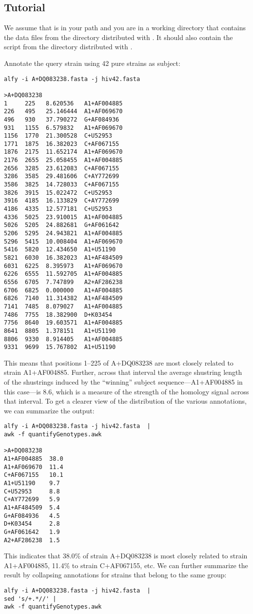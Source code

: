\documentclass[a4paper]{article}
\begin{document}
\begin{itemize}
\section{Tutorial}
We assume that  is in your path and you are in a working
directory that contains the data files from the directory 
distributed with . It should also contain the script
 from the directory  distributed
with .

\bi \I Annotate the query strain  using 42 pure strains
as subject:
\begin{verbatim}
alfy -i A+DQ083238.fasta -j hiv42.fasta

>A+DQ083238
1     225   8.620536   A1+AF004885
226   495   25.146444  A1+AF069670
496   930   37.790272  G+AF084936
931   1155  6.579832   A1+AF069670
1156  1770  21.300528  C+U52953
1771  1875  16.382023  C+AF067155
1876  2175  11.652174  A1+AF069670
2176  2655  25.058455  A1+AF004885
2656  3285  23.612083  C+AF067155
3286  3585  29.481606  C+AY772699
3586  3825  14.728033  C+AF067155
3826  3915  15.022472  C+U52953
3916  4185  16.133829  C+AY772699
4186  4335  12.577181  C+U52953
4336  5025  23.910015  A1+AF004885
5026  5205  24.882681  G+AF061642
5206  5295  24.943821  A1+AF004885
5296  5415  10.008404  A1+AF069670
5416  5820  12.434650  A1+U51190
5821  6030  16.382023  A1+AF484509
6031  6225  8.395973   A1+AF069670
6226  6555  11.592705  A1+AF004885
6556  6705  7.747899   A2+AF286238
6706  6825  0.000000   A1+AF004885
6826  7140  11.314382  A1+AF484509
7141  7485  8.079027   A1+AF004885
7486  7755  18.382900  D+K03454
7756  8640  19.603571  A1+AF004885
8641  8805  1.378151   A1+U51190
8806  9330  8.914405   A1+AF004885
9331  9699  15.767802  A1+U51190
\end{verbatim}
This means that positions 1--225 of A+DQ083238 are most closely
related to strain A1+AF004885. Further, across that interval the
average shustring length of the shustrings induced by the ``winning''
subject sequence---A1+AF004885 in this case---is 8.6, which is a measure of the strength of
the homology signal across that interval.
\I To get a clearer view of the distribution of the various annotations, we can
summarize the output:
\begin{verbatim}
alfy -i A+DQ083238.fasta -j hiv42.fasta  | 
awk -f quantifyGenotypes.awk

>A+DQ083238
A1+AF004885  38.0
A1+AF069670  11.4
C+AF067155   10.1
A1+U51190    9.7
C+U52953     8.8
C+AY772699   5.9
A1+AF484509  5.4
G+AF084936   4.5
D+K03454     2.8
G+AF061642   1.9
A2+AF286238  1.5
\end{verbatim}
This indicates that 38.0\% of strain A+DQ083238 is most closely related
to strain A1+AF004885, 11.4\% to strain C+AF067155, etc. We can
further summarize the result by collapsing annotations for strains that
belong to the same group:
\begin{verbatim}
alfy -i A+DQ083238.fasta -j hiv42.fasta  | 
sed 's/+.*//' | 
awk -f quantifyGenotypes.awk


\end{verbatim}
\end{itemize}
\end{document}
